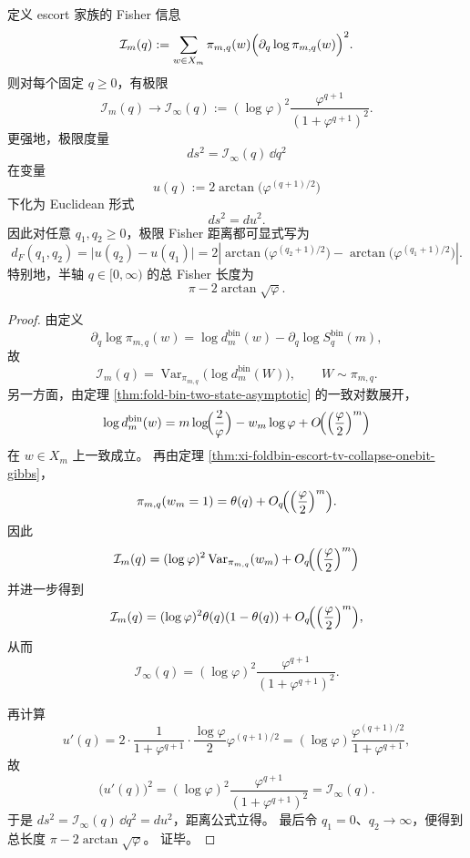 \begin{theorem}\label{thm:xi-foldbin-escort-logistic-fisher-geometry}
定义 escort 家族的 Fisher 信息
\[
\mathcal I_m(q)
:=
\sum_{w\in X_m}\pi_{m,q}(w)\Bigl(\partial_q\log \pi_{m,q}(w)\Bigr)^2.
\]
则对每个固定 \(q\ge 0\)，有极限
\[
\mathcal I_m(q)\longrightarrow \mathcal I_\infty(q)
:=
(\log\varphi)^2\frac{\varphi^{q+1}}{(1+\varphi^{q+1})^2}.
\]
更强地，极限度量
\[
ds^2=\mathcal I_\infty(q)\,\dd q^2
\]
在变量
\[
u(q):=2\arctan\!\bigl(\varphi^{(q+1)/2}\bigr)
\]
下化为 Euclidean 形式
\[
ds^2=du^2.
\]
因此对任意 \(q_1,q_2\ge 0\)，极限 Fisher 距离都可显式写为
\[
d_F(q_1,q_2)
=
\bigl|u(q_2)-u(q_1)\bigr|
=
2\left|
\arctan\!\bigl(\varphi^{(q_2+1)/2}\bigr)
-
\arctan\!\bigl(\varphi^{(q_1+1)/2}\bigr)
\right|.
\]
特别地，半轴 \(q\in[0,\infty)\) 的总 Fisher 长度为
\[
\pi-2\arctan\sqrt{\varphi}.
\]
\end{theorem}
\begin{proof}
由定义
\[
\partial_q\log\pi_{m,q}(w)
=
\log d_m^{\mathrm{bin}}(w)-\partial_q\log S_q^{\mathrm{bin}}(m),
\]
故
\[
\mathcal I_m(q)
=
\operatorname{Var}_{\pi_{m,q}}\!\bigl(\log d_m^{\mathrm{bin}}(W)\bigr),
\qquad
W\sim \pi_{m,q}.
\]
另一方面，由定理 \ref{thm:fold-bin-two-state-asymptotic} 的一致对数展开，
\[
\log d_m^{\mathrm{bin}}(w)
=
m\log\!\Bigl(\frac{2}{\varphi}\Bigr)-w_m\log\varphi
+O\!\Bigl(\Bigl(\frac{\varphi}{2}\Bigr)^m\Bigr)
\]
在 \(w\in X_m\) 上一致成立。
再由定理 \ref{thm:xi-foldbin-escort-tv-collapse-onebit-gibbs}，
\[
\pi_{m,q}(w_m=1)
=
\theta(q)+O_q\!\Bigl(\Bigl(\frac{\varphi}{2}\Bigr)^m\Bigr).
\]
因此
\[
\mathcal I_m(q)
=
(\log\varphi)^2\operatorname{Var}_{\pi_{m,q}}(w_m)
+O_q\!\Bigl(\Bigl(\frac{\varphi}{2}\Bigr)^m\Bigr)
\]
并进一步得到
\[
\mathcal I_m(q)
=
(\log\varphi)^2\theta(q)(1-\theta(q))
+O_q\!\Bigl(\Bigl(\frac{\varphi}{2}\Bigr)^m\Bigr),
\]
从而
\[
\mathcal I_\infty(q)
=
(\log\varphi)^2\frac{\varphi^{q+1}}{(1+\varphi^{q+1})^2}.
\]

再计算
\[
u'(q)
=
2\cdot \frac{1}{1+\varphi^{q+1}}
\cdot \frac{\log\varphi}{2}\varphi^{(q+1)/2}
=
(\log\varphi)\frac{\varphi^{(q+1)/2}}{1+\varphi^{q+1}},
\]
故
\[
\bigl(u'(q)\bigr)^2
=
(\log\varphi)^2\frac{\varphi^{q+1}}{(1+\varphi^{q+1})^2}
=
\mathcal I_\infty(q).
\]
于是
\(
ds^2=\mathcal I_\infty(q)\,\dd q^2=du^2
\)，距离公式立得。
最后令 \(q_1=0\)、\(q_2\to\infty\)，便得到总长度
\(
\pi-2\arctan\sqrt{\varphi}
\)。
证毕。
\end{proof}

